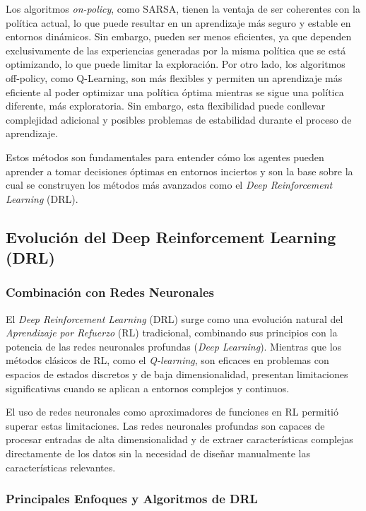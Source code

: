 \documentclass[a4paper,12pt, twoside]{report}
\begin{document}
Los algoritmos \textit{on-policy}, como SARSA, tienen la ventaja de ser coherentes con la política 
actual, lo que puede resultar en un aprendizaje más seguro y estable en entornos dinámicos. Sin embargo, 
pueden ser menos eficientes, ya que dependen exclusivamente de las experiencias generadas por la misma 
política que se está optimizando, lo que puede limitar la exploración. Por otro lado, los algoritmos 
off-policy, como Q-Learning, son más flexibles y permiten un aprendizaje más eficiente al poder optimizar 
una política óptima mientras se sigue una política diferente, más exploratoria. Sin embargo, esta 
flexibilidad puede conllevar complejidad adicional y posibles problemas de estabilidad durante el 
proceso de aprendizaje.

Estos métodos son fundamentales para entender cómo los agentes pueden aprender a tomar decisiones 
óptimas en entornos inciertos y son la base sobre la cual se construyen los métodos más avanzados 
como el \textit{Deep Reinforcement Learning} (DRL).


\subsection{Evolución del Deep Reinforcement Learning (DRL)}

\subsubsection{Combinación con Redes Neuronales}

El \textit{Deep Reinforcement Learning} (DRL) surge como una evolución natural del 
\textit{Aprendizaje por Refuerzo} (RL) tradicional, combinando sus principios con la potencia 
de las redes neuronales profundas (\textit{Deep Learning}). Mientras que los métodos clásicos 
de RL, como el \textit{Q-learning}, son eficaces en problemas con espacios de estados discretos 
y de baja dimensionalidad, presentan limitaciones significativas cuando se aplican a entornos 
complejos y continuos.

El uso de redes neuronales como aproximadores de funciones en RL permitió superar estas 
limitaciones. Las redes neuronales profundas son capaces de procesar entradas de alta 
dimensionalidad y de extraer características complejas directamente de los datos sin la necesidad 
de diseñar manualmente las características relevantes. 

\subsubsection{Principales Enfoques y Algoritmos de DRL}
\end{document}
